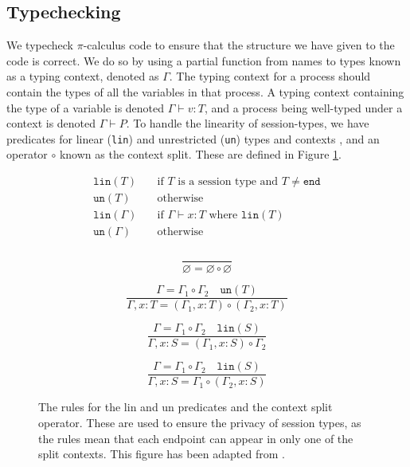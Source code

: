 \documentclass{l4proj}
\begin{document}
\subsection{Typechecking}
\label{bgSesTCh}

\quad We typecheck $\pi$-calculus code to ensure that the structure we have given to the code is correct. We do so by using a partial function from names to types known as a typing context, denoted as $\Gamma$. The typing context for a process should contain the types of all the variables in that process. A typing context containing the type of a variable is denoted $\Gamma \vdash v : T$, and a process being well-typed under a context is denoted $\Gamma \vdash P$. To handle the linearity of session-types, we have predicates for linear (\texttt{lin}) and unrestricted (\texttt{un}) types and contexts \citep{VASCONCELOS201252}, and an operator $\circ$ known as the context split. These are defined in Figure \ref{fig:split}.

\begin{figure}[H]
\begin{subfigure}{\textwidth}
\begin{align*}
\texttt{lin}(T) &\quad \text{if }T \text{ is a session type and }T \neq \texttt{end} \\
\texttt{un}(T) &\quad \text{otherwise} \\
\texttt{lin}(\Gamma) &\quad \text{if }\Gamma \vdash x : T \text{ where } \texttt{lin}(T)\\
\texttt{un}(\Gamma) &\quad \text{otherwise} \\
\end{align*}
\end{subfigure}
\begin{subfigure}{0.32\textwidth}
\[\frac{}{\varnothing = \varnothing \circ \varnothing}\]
\vspace{\fill}
\end{subfigure}
\begin{subfigure}{0.64\textwidth}
\[\frac{\Gamma = \Gamma_{1} \circ \Gamma_{2} \quad \texttt{un}(T   )}{\Gamma, x : T = (\Gamma_{1}, x : T) \circ (\Gamma_{2}, x : T)}\]
\vspace{\fill}
\end{subfigure}
\begin{subfigure}{0.48\textwidth}
\[\frac{\Gamma = \Gamma_{1} \circ \Gamma_{2} \quad \texttt{lin}(S)}{\Gamma, x : S = (\Gamma_{1}, x : S) \circ \Gamma_{2}}\]
\end{subfigure}
\begin{subfigure}{0.48\textwidth}
\[\frac{\Gamma = \Gamma_{1} \circ \Gamma_{2} \quad \texttt{lin}(S)}{\Gamma, x : S = \Gamma_{1} \circ (\Gamma_{2}, x : S)}\]
\end{subfigure}
\caption{The rules for the lin and un predicates and the context split operator. These are used to ensure the privacy of session types, as the rules mean that each endpoint can appear in only one of the split contexts. This figure has been adapted from \citet{DARDHA2017253}.}
\label{fig:split}
\end{figure}
\end{document}
